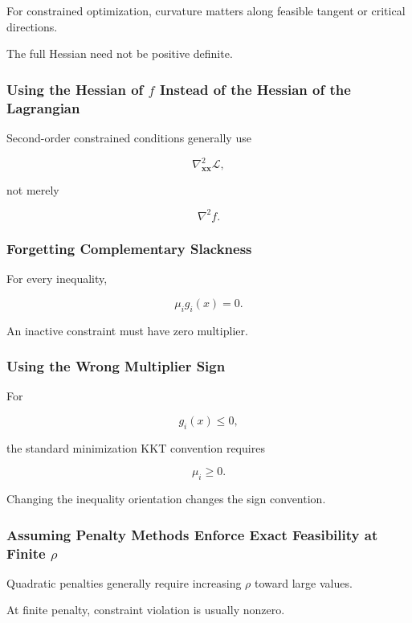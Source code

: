 For constrained optimization, curvature matters along feasible tangent or
critical directions.

The full Hessian need not be positive definite.

\subsubsection{Using the Hessian of \(f\) Instead of the Hessian of the Lagrangian}

Second-order constrained conditions generally use

\[
\boxed{
\nabla_{\mathbf{x}\mathbf{x}}^2
\mathcal{L},
}
\]

not merely

\[
\nabla^2f.
\]

\subsubsection{Forgetting Complementary Slackness}

For every inequality,

\[
\boxed{
\mu_i g_i(x)=0.
}
\]

An inactive constraint must have zero multiplier.

\subsubsection{Using the Wrong Multiplier Sign}

For

\[
g_i(x)\leq0,
\]

the standard minimization KKT convention requires

\[
\boxed{
\mu_i\geq0.
}
\]

Changing the inequality orientation changes the sign convention.

\subsubsection{Assuming Penalty Methods Enforce Exact Feasibility at Finite \(\rho\)}

Quadratic penalties generally require increasing \(\rho\) toward large
values.

At finite penalty, constraint violation is usually nonzero.

